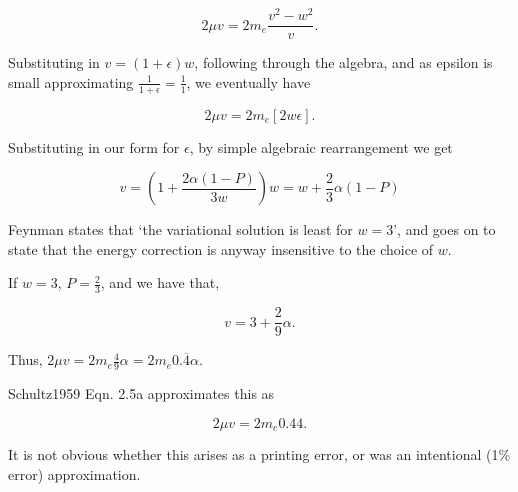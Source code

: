 \documentclass[twocolumn,11pt]{article}
\begin{document}
\begin{equation}
    2\mu v = 2m_e \frac{v^2-w^2}{v}.
\end{equation}

Substituting in $v=(1+\epsilon)w$, following through the algebra, and
as epsilon is small approximating $\frac{1}{1+\epsilon}=\frac{1}{1}$,
we eventually have

\begin{equation}
    2\mu v = 2m_e[2w\epsilon].
\end{equation}

Substituting in our form for $\epsilon$, by simple algebraic
rearrangement we get

\begin{equation}
    v=(1+\frac{2\alpha(1-P)}{3w})w = w + \frac{2}{3} \alpha (1-P)
\end{equation}

Feynman states that `the variational solution is least for $w=3$', and
goes on to state that the energy correction is anyway insensitive to the
choice of $w$.

If $w=3$, \(P=\frac{2}{3}\), and we have that,

\begin{equation}
    v=3+\frac{2}{9}\alpha .
\end{equation}

Thus, $2\mu v = 2m_e \frac{4}{9}\alpha = 2m_e 0.\overline{4} \alpha$.

Schultz1959 Eqn. 2.5a approximates this as 

\begin{equation}
    2\mu v = 2m_e 0.44 . 
\end{equation}

It is not obvious whether this arises as a printing error, or was an
intentional (1\% error) approximation.


\end{document}
